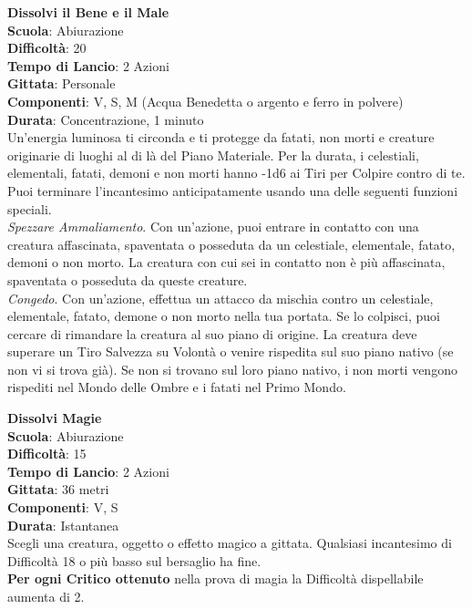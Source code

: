 \begin{multicols}{2}
\medskip\textbf{Dissolvi il Bene e il Male}\\
\textbf{Scuola}: Abiurazione\\
\textbf{Difficoltà}: 20\\
\textbf{Tempo di Lancio}: 2 Azioni\\
\textbf{Gittata}: Personale\\
\textbf{Componenti}: V, S, M (Acqua Benedetta o argento e ferro in polvere)\\
\textbf{Durata}: Concentrazione, 1 minuto \\
Un'energia luminosa ti circonda e ti protegge da fatati, non morti e creature originarie di luoghi al di là del Piano Materiale. Per la durata, i celestiali, elementali, fatati, demoni e non morti hanno -1d6 ai Tiri per Colpire contro di te. Puoi terminare l'incantesimo anticipatamente usando una delle seguenti funzioni speciali.\\
\textit{Spezzare Ammaliamento}. Con un'azione, puoi entrare in contatto con una creatura affascinata, spaventata o posseduta da un celestiale, elementale, fatato, demoni o non morto. La creatura con cui sei in contatto non è più affascinata, spaventata o posseduta da queste creature.\\
\textit{Congedo}. Con un'azione, effettua un attacco da mischia contro un celestiale, elementale, fatato, demone o non morto nella tua portata. Se lo colpisci, puoi cercare di rimandare la creatura al suo piano di origine. La creatura deve superare un Tiro Salvezza su Volontà o venire rispedita sul suo piano nativo (se non vi si trova già). Se non si trovano sul loro piano nativo, i non morti vengono rispediti nel Mondo delle Ombre e i fatati nel Primo Mondo.

\medskip\textbf{Dissolvi Magie}\\
\textbf{Scuola}: Abiurazione\\
\textbf{Difficoltà}: 15\\
\textbf{Tempo di Lancio}: 2 Azioni\\
\textbf{Gittata}: 36 metri\\
\textbf{Componenti}: V, S\\
\textbf{Durata}: Istantanea\\
Scegli una creatura, oggetto o effetto magico a gittata. Qualsiasi incantesimo di Difficoltà 18 o più basso sul bersaglio ha fine. \\
\textbf{Per ogni Critico ottenuto} nella prova di magia la Difficoltà dispellabile aumenta di 2.


\end{multicols}
